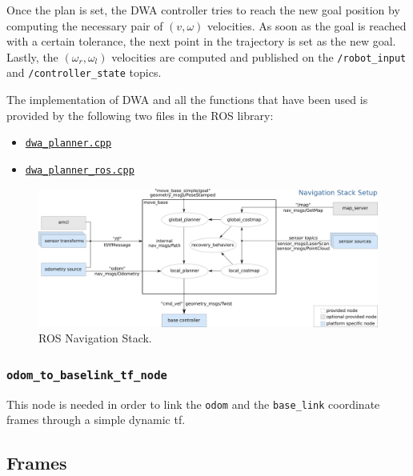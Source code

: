\documentclass[11pt,a4paper]{article}
\begin{document}
Once the plan is set, the DWA controller tries to reach the new goal position by computing the necessary pair of $(v, \omega)$ velocities. As soon as the goal is reached with a certain tolerance, the next point in the trajectory is set as the new goal.\\

Lastly, the $(\omega_r,\omega_l)$ velocities are computed and published on the \texttt{/robot\_input} and \texttt{/controller\_state} topics.

The implementation of DWA and all the functions that have been used is provided by the following two files in the ROS library:
\begin{itemize}
    \item \href{https://docs.ros.org/en/melodic/api/dwa\_local\_planner/html/dwa\_\_planner\_8cpp\_source.html}{\texttt{dwa\_planner.cpp}}
    \item \href{https://docs.ros.org/en/melodic/api/dwa\_local\_planner/html/dwa\_\_planner\_\_ros\_8cpp\_source.html}{\texttt{dwa\_planner\_ros.cpp}}
\end{itemize}

\begin{figure}[H]
    \centering
    \includegraphics[scale=0.4]{other/navigation_stack.png}
    \caption{ROS Navigation Stack.}
\end{figure}

\subsubsection{\texttt{odom\_to\_baselink\_tf\_node}}

This node is needed in order to link the \texttt{odom} and the \texttt{base\_link} coordinate frames through a simple dynamic tf.



\subsection{Frames}
\end{document}
